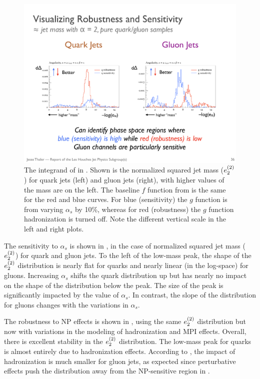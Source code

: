 \begin{figure}[t]
\begin{center}
\includegraphics[width = 0.99\columnwidth]{figures/differentialseparation.pdf}
\end{center}
\caption{The integrand of  in \herwig.  Shown is the normalized squared jet mass ($e_{2}^{(2)}$)  for quark jets (left) and gluon jets (right), with higher values of the mass are on the left.  The baseline $f$ function from  is the same for the red and blue curves.  For blue (sensitivity) the $g$ function is from varying $\alpha_s$ by 10\%, whereas for red (robustness) the $g$ function hadronization is turned off.  Note the different vertical scale in the left and right plots. }
\label{fig:differentialseparation}
\end{figure}

The sensitivity to $\alpha_s$ is shown in , in the case of normalized squared jet mass ($e_{2}^{(2)}$) for quark and gluon jets.
%
To the left of the low-mass peak, the shape of the $e_{2}^{(2)}$ distribution is nearly flat for quarks and nearly linear (in the log-space) for gluons.
%
Increasing $\alpha_s$ shifts the quark distribution up but has nearly no impact on the shape of the distribution below the peak.
%
The size of the peak is significantly impacted by the value of $\alpha_s$.
%
In contrast, the slope of the distribution for gluons changes with the variations in $\alpha_s$.

The robustness to NP effects is shown in , using the same $e_{2}^{(2)}$ distribution but now with variations in the modeling of hadronization and MPI effects.
%
Overall, there is excellent stability in the $e_{2}^{(2)}$ distribution.
%
The low-mass peak for quarks is almost entirely due to hadronization effects.
%
According to \herwig, the impact of hadronization is much smaller for gluon jets, as expected since perturbative effects push the distribution away from the NP-sensitive region in .

